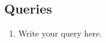 \documentclass[../main.tex]{subfiles}
\begin{document}
\subsection*{Queries}

\begin{enumerate}[label=\textbf{Q\arabic*.}]

  \item Write your query here.

\end{enumerate}
\end{document}
